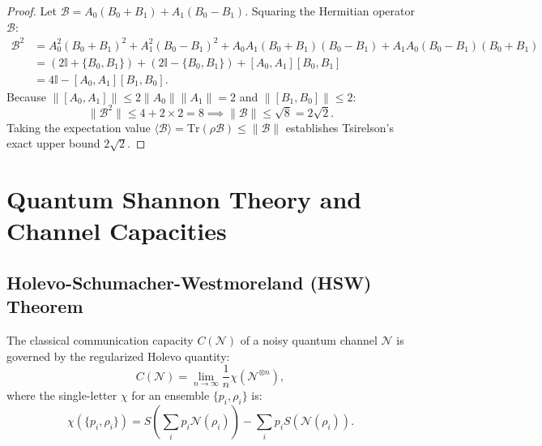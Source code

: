 \begin{proof}
Let $\mathcal{B} = A_0(B_0 + B_1) + A_1(B_0 - B_1)$. Squaring the Hermitian operator $\mathcal{B}$:
\begin{align}
    \mathcal{B}^2 &= A_0^2(B_0 + B_1)^2 + A_1^2(B_0 - B_1)^2 + A_0 A_1 (B_0+B_1)(B_0-B_1) + A_1 A_0 (B_0-B_1)(B_0+B_1) \nonumber \\
    &= (2\mathbb{I} + \{B_0, B_1\}) + (2\mathbb{I} - \{B_0, B_1\}) + [A_0, A_1] [B_0, B_1] \nonumber \\
    &= 4\mathbb{I} - [A_0, A_1] [B_1, B_0].
\end{align}
Because $\|[A_0, A_1]\| \le 2 \|A_0\| \|A_1\| = 2$ and $\|[B_1, B_0]\| \le 2$:
\begin{equation}
    \|\mathcal{B}^2\| \le 4 + 2 \times 2 = 8 \implies \|\mathcal{B}\| \le \sqrt{8} = 2\sqrt{2}.
\end{equation}
Taking the expectation value $\langle \mathcal{B} \rangle = \text{Tr}(\rho \mathcal{B}) \le \|\mathcal{B}\|$ establishes Tsirelson's exact upper bound $2\sqrt{2}$.
\end{proof}

\section{Quantum Shannon Theory and Channel Capacities}
\label{sec:app_quantum_shannon}

\subsection{Holevo-Schumacher-Westmoreland (HSW) Theorem}
The classical communication capacity $C(\mathcal{N})$ of a noisy quantum channel $\mathcal{N}$ is governed by the regularized Holevo quantity:
\begin{equation}
    C(\mathcal{N}) = \lim_{n \to \infty} \frac{1}{n} \chi\left(\mathcal{N}^{\otimes n}\right),
\end{equation}
where the single-letter  $\chi$ for an ensemble $\{p_i, \rho_i\}$ is:
\begin{equation}
    \chi\left(\{p_i, \rho_i\}\right) = S\left( \sum_i p_i \mathcal{N}(\rho_i) \right) - \sum_i p_i S\left(\mathcal{N}(\rho_i)\right).
    \label{eq:holevo_bound_full}
\end{equation}

